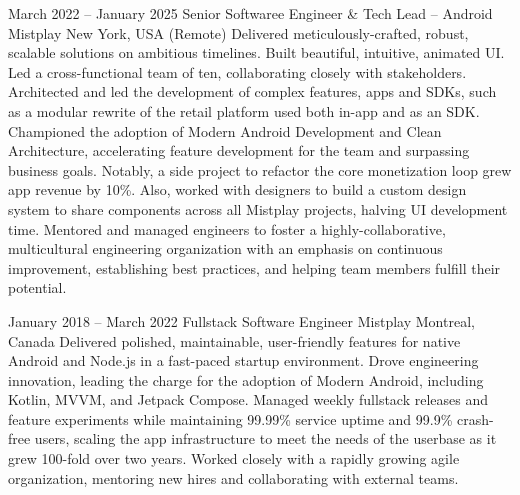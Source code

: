 \documentclass[10pt,a4paper,sans]{moderncv} %
\newcommand{\vs}[0]{\smallskip}
\begin{document}
\cventry
{March 2022 -- January 2025}
{Senior Softwaree Engineer \& Tech Lead -- Android}
{{Mistplay}}
{New York, USA (Remote)}
{}{
	Delivered meticulously-crafted, robust, scalable solutions on ambitious timelines. Built beautiful, intuitive, animated UI.
	Led a cross-functional team of ten, collaborating closely with stakeholders.
	Architected and led the development of complex features, apps and SDKs, such as a modular rewrite of the retail platform used both in-app and as an SDK.
	Championed the adoption of Modern Android Development and Clean Architecture, accelerating feature development for the team and surpassing business goals. Notably, a side project to refactor the core monetization loop grew app revenue by 10\%. Also, worked with designers to build a custom design system to share components across all Mistplay projects, halving UI development time.
	Mentored and managed engineers to foster a highly-collaborative, multicultural engineering organization with an emphasis on continuous improvement, establishing best practices, and helping team members fulfill their potential.
}\vs

\cventry
{January 2018 -- March 2022}
{Fullstack Software Engineer}
{{Mistplay}}
{Montreal, Canada}
{}
{
	Delivered polished, maintainable, user-friendly features for native Android and Node.js in a fast-paced startup environment.
	Drove engineering innovation, leading the charge for the adoption of Modern Android, including Kotlin, MVVM, and Jetpack Compose.
	Managed weekly fullstack releases and feature experiments while maintaining 99.99\% service uptime and 99.9\% crash-free users, scaling the app infrastructure to meet the needs of the userbase as it grew 100-fold over two years.
	Worked closely with a rapidly growing agile organization, mentoring new hires and collaborating with external teams.
}\vs

\vs


\end{document}
